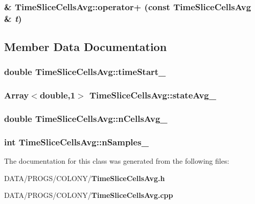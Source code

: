 \subsubsection{ \& TimeSliceCellsAvg::operator+ (const {\bf TimeSliceCellsAvg} \& {\em t})}\label{classTimeSliceCellsAvg_b0779f20c3146a7e3377767b38260e37}




\subsection{Member Data Documentation}
\subsubsection{\setlength{\rightskip}{0pt plus 5cm}double {\bf TimeSliceCellsAvg::timeStart\_\-}}\label{classTimeSliceCellsAvg_26cd7ddaee9fd247af1b03c019efdc27}


\subsubsection{\setlength{\rightskip}{0pt plus 5cm}Array$<$double,1$>$ {\bf TimeSliceCellsAvg::stateAvg\_\-}}\label{classTimeSliceCellsAvg_ac43db30ea3a41ee3ed291a557a73a25}


\subsubsection{\setlength{\rightskip}{0pt plus 5cm}double {\bf TimeSliceCellsAvg::nCellsAvg\_\-}}\label{classTimeSliceCellsAvg_c609f33983b3baf1de2a8191f668babf}


\subsubsection{\setlength{\rightskip}{0pt plus 5cm}int {\bf TimeSliceCellsAvg::nSamples\_\-}}\label{classTimeSliceCellsAvg_9fff6ffad7cd3089cd7a1b4b9cd63a71}




The documentation for this class was generated from the following files:\begin{CompactItemize}
\item 
DATA/PROGS/COLONY/{\bf TimeSliceCellsAvg.h}\item 
DATA/PROGS/COLONY/{\bf TimeSliceCellsAvg.cpp}\end{CompactItemize}
